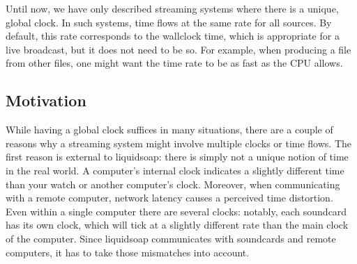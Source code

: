 
Until now, we have only described streaming systems where there is
a unique, global clock. In such systems, time flows at the same rate
for all sources.
By default, this rate corresponds to the wallclock time,
which is appropriate for a live broadcast,
but it does not need to be so.
For example, when producing a file from other files,
one might want the time rate to be as fast as the CPU allows.

\subsection{Motivation}

While having a global clock suffices in many situations,
there are a couple of reasons why a streaming system might involve multiple
clocks or time flows.
The first reason is external to liquidsoap: there is simply
not a unique notion of time in the real world.
A computer's internal clock indicates a slightly different time
than your watch or another computer's clock.
Moreover, when communicating with a remote computer, network
latency causes a perceived time distortion.
Even within a single computer there are several clocks: notably, each
soundcard has its own clock, which will tick at a slightly different
rate than the main clock of the computer.
Since liquidsoap communicates with soundcards and remote computers,
it has to take those mismatches into account.

